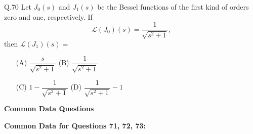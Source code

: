 \documentclass{article}
\begin{document}
																																																																																																											       Q.70 \quad Let $J_0(s)$ and $J_1(s)$ be the Bessel functions of the first kind of orders zero and one, respectively. If
																																																																																																											       \[
																																																																																																											       \mathcal{L}(J_0)(s) = \frac{1}{\sqrt{s^2 + 1}},
																																																																																																											       \]
																																																																																																											       then $\mathcal{L}(J_1)(s) =$
																																																																																																											       \begin{itemize}
																																																																																																											           \item[(A)] $\dfrac{s}{\sqrt{s^2 + 1}}$ \hspace{6cm} (B) $\dfrac{1}{\sqrt{s^2 + 1}}$
																																																																																																												       \item[(C)] $1 - \dfrac{1}{\sqrt{s^2 + 1}}$ \hspace{5.5cm} (D) $\dfrac{1}{\sqrt{s^2 + 1}} - 1$
																																																																																																												           
																																																																																																													   \end{itemize}

																																																																																																													   \bigskip
																																																																																																													   \begin{center}
																																																																																																													       \textbf{Common Data Questions}
																																																																																																													       \end{center}
																																																																																																													       \bigskip
																																																																																																													       \textbf{Common Data for Questions 71, 72, 73:}
\end{document}
